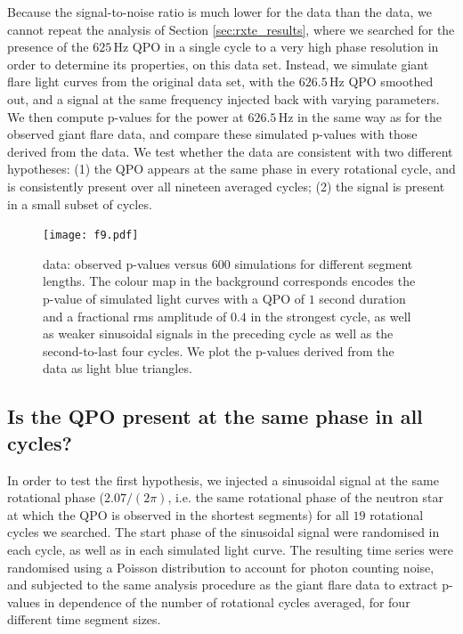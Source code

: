 \documentclass{emulateapj}
\begin{document}
Because the signal-to-noise ratio is much lower for the \rhessi data than the \rxte data, we cannot repeat the analysis of Section \ref{sec:rxte_results}, where we searched for the presence of the $625 \, \mathrm{Hz}$ QPO in a single cycle to a very high phase resolution in order to determine its properties, on this data set. Instead, we simulate giant flare light curves from the original data set, with the $626.5 \, \mathrm{Hz}$ QPO smoothed out, and a signal at the same frequency injected back with varying parameters. We then compute p-values for the power at $626.5 \, \mathrm{Hz}$ in the same way as for the observed giant flare data, and compare these simulated p-values with those derived from the data. We test whether the data are consistent with two different hypotheses: (1) the QPO appears at the same phase in every rotational cycle, and is consistently present over all nineteen averaged cycles; (2) the signal is present in a small subset of cycles.

 \begin{figure}[htbp]
\begin{center}
\texttt{[image: f9.pdf]}
\caption{\rhessi data: observed p-values versus $600$ simulations for different segment lengths. The colour map in the background corresponds encodes the p-value of simulated light curves with a QPO of $1$ second duration and a fractional rms amplitude of $0.4$ in the strongest cycle, as well as weaker sinusoidal signals in the preceding cycle as well as the second-to-last four cycles. We plot the p-values derived from the \rhessi data as light blue triangles.}
\label{fig:rhessi_sims3_pvalues}
\end{center}
\end{figure}

\subsection{Is the QPO present at the same phase in all cycles?}

In order to test the first hypothesis, we injected a sinusoidal signal at the same rotational phase ($2.07/(2\pi)$, i.e. the same rotational phase of the neutron star at which the QPO is observed in the shortest segments) for all $19$ rotational cycles we searched. The start phase of the sinusoidal signal were randomised in each cycle, as well as in each simulated light curve. The resulting time series were randomised using a Poisson distribution to account for photon counting noise, and subjected to the same analysis procedure as the giant flare data to extract p-values in dependence of the number of rotational cycles averaged, for four different time segment sizes.
\end{document}
